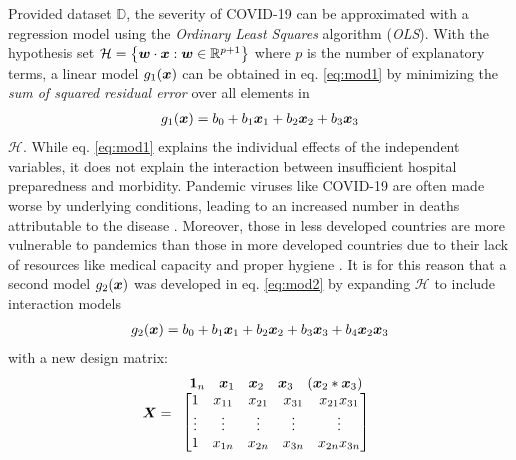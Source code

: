 \documentclass[12pt]{article}
\begin{document}
Provided dataset $\mathbb{D}$, the severity of COVID-19 can be approximated with a regression model using the \emph{Ordinary Least Squares} algorithm (\emph{OLS}). With the hypothesis set $\mathcal{H} = \big\{\boldsymbol{w} \cdot \boldsymbol{x} : \boldsymbol{w} \in \mathbb{R}^{p+1} \big\}$ where $p$ is the number of explanatory terms, a linear model $g_1(\boldsymbol{x})$ can be obtained in eq. \ref{eq:mod1} by minimizing the \emph{sum of squared residual error} over all elements in 
\begin{align} \label{eq:mod1}
    g_1(\boldsymbol{x}) = b_0 + b_1\boldsymbol{x}_1 + b_2\boldsymbol{x}_2 + b_3\boldsymbol{x}_3
\end{align}
$\mathcal{H}$. While eq. \ref{eq:mod1} explains the individual effects of the independent variables, it does not explain the interaction between insufficient hospital preparedness and morbidity. 
Pandemic viruses like COVID-19 are often made worse by underlying conditions, leading to an increased number in deaths attributable to the disease \cite{pandemicDef}. Moreover, those in less developed countries are more vulnerable to pandemics than those in more developed countries due to their lack of resources like medical capacity and proper hygiene \cite{diseaseControl}.
It is for this reason that a second model $g_2(\boldsymbol{x})$ was developed in eq. \ref{eq:mod2} by expanding $\mathcal{H}$ to include interaction models 
\begin{align} \label{eq:mod2}
    g_2(\boldsymbol{x}) = b_0 + b_1\boldsymbol{x}_1 + b_2\boldsymbol{x}_2 + b_3\boldsymbol{x}_3 + b_4\boldsymbol{x}_2\boldsymbol{x}_3
\end{align}
with a new design matrix:
\begin{align*} \boldsymbol{X} = 
    \begin{array}{c c}
        \begin{array}{c c c c c}
            \boldsymbol{1}_n & \boldsymbol{x}_1 & \boldsymbol{x}_2 & \boldsymbol{x}_3 & (\boldsymbol{x}_2*\boldsymbol{x}_3) \\
        \end{array} \\
	    \begin{bmatrix}
		    1 & x_{11} & x_{21} & x_{31} & x_{21}x_{31} \\
            \vdots & \vdots & \vdots & \vdots & \vdots \\
            1 & x_{1n} & x_{2n} & x_{3n} & x_{2n}x_{3n}
	    \end{bmatrix}
	\end{array}
\end{align*} 
\end{document}
